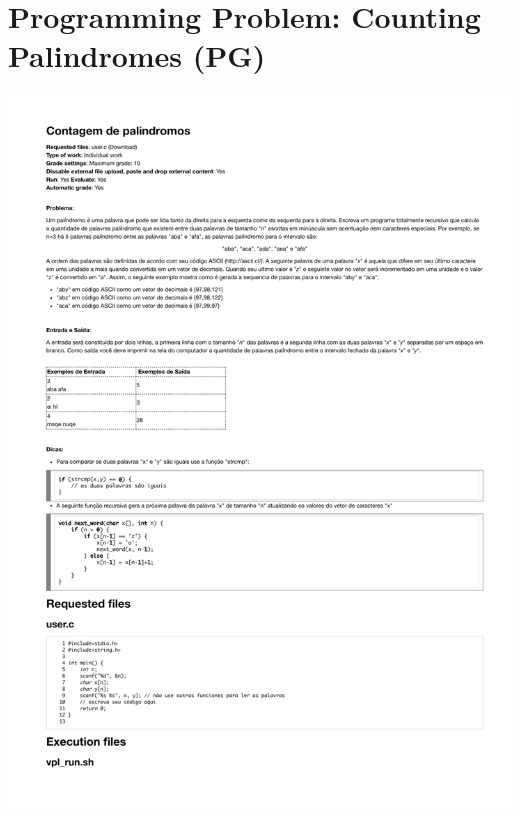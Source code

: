 \section{Programming Problem: Counting Palindromes (PG)}
\label{annex:third-study-pG}
\includegraphics[page=1,width=1\textwidth]{images/annex/third-study-pG.pdf}

\newpage
